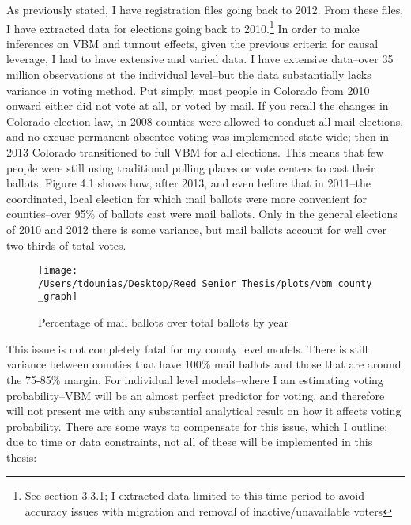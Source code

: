\documentclass[12pt,twoside]{reedthesis}
\begin{document}
  As previously stated, I have registration files going back to 2012. From
  these files, I have extracted data for elections going back to
  2010.\footnote{See section 3.3.1; I extracted data limited to this time
    period to avoid accuracy issues with migration and removal of
    inactive/unavailable voters} In order to make inferences on VBM and
  turnout effects, given the previous criteria for causal leverage, I had
  to have extensive and varied data. I have extensive data--over 35
  million observations at the individual level--but the data substantially
  lacks variance in voting method. Put simply, most people in Colorado
  from 2010 onward either did not vote at all, or voted by mail. If you
  recall the changes in Colorado election law, in 2008 counties were
  allowed to conduct all mail elections, and no-excuse permanent absentee
  voting was implemented state-wide; then in 2013 Colorado transitioned to
  full VBM for all elections. This means that few people were still using
  traditional polling places or vote centers to cast their ballots. Figure
  4.1 shows how, after 2013, and even before that in 2011--the
  coordinated, local election for which mail ballots were more convenient
  for counties--over 95\% of ballots cast were mail ballots. Only in the
  general elections of 2010 and 2012 there is some variance, but mail
  ballots account for well over two thirds of total votes.
  
  \begin{figure}
  
  {\centering \texttt{[image: /Users/tdounias/Desktop/Reed\_Senior\_Thesis/plots/vbm\_county\_graph]} 
  
  }
  
  \caption[Percentage of mail ballots over total ballots by year]{Percentage of mail ballots over total ballots by year}\label{fig:vbm png}
  \end{figure}
  
  This issue is not completely fatal for my county level models. There is
  still variance between counties that have 100\% mail ballots and those
  that are around the 75-85\% margin. For individual level models--where I
  am estimating voting probability--VBM will be an almost perfect
  predictor for voting, and therefore will not present me with any
  substantial analytical result on how it affects voting probability.
  There are some ways to compensate for this issue, which I outline; due
  to time or data constraints, not all of these will be implemented in
  this thesis:
  
\end{document}
